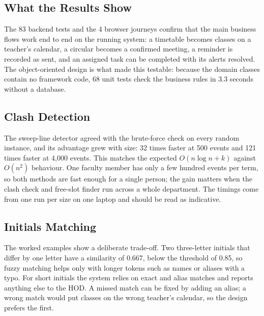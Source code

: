 
\subsection{What the Results Show}
The 83 backend tests and the 4 browser journeys confirm that the main business flows work end to end on the running system: a timetable becomes classes on a teacher's calendar, a circular becomes a confirmed meeting, a reminder is recorded as sent, and an assigned task can be completed with its alerts resolved. The object-oriented design is what made this testable: because the domain classes contain no framework code, 68 unit tests check the business rules in 3.3 seconds without a database.

\subsection{Clash Detection}
The sweep-line detector agreed with the brute-force check on every random instance, and its advantage grew with size: 32 times faster at 500 events and 121 times faster at 4,000 events. This matches the expected $O(n \log n + k)$ against $O(n^2)$ behaviour. One faculty member has only a few hundred events per term, so both methods are fast enough for a single person; the gain matters when the clash check and free-slot finder run across a whole department. The timings come from one run per size on one laptop and should be read as indicative.

\subsection{Initials Matching}
The worked examples show a deliberate trade-off. Two three-letter initials that differ by one letter have a similarity of 0.667, below the threshold of 0.85, so fuzzy matching helps only with longer tokens such as names or aliases with a typo. For short initials the system relies on exact and alias matches and reports anything else to the HOD. A missed match can be fixed by adding an alias; a wrong match would put classes on the wrong teacher's calendar, so the design prefers the first.

